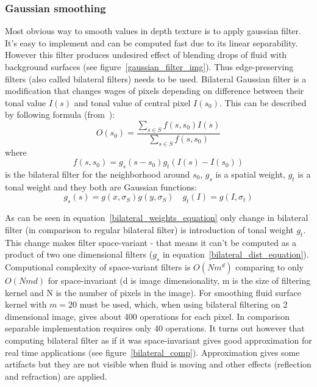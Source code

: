 \subsubsection{Gaussian smoothing} \label{sec:gaussiansmoothing}
Most obvious way to smooth values in depth texture is to apply gaussian filter. It's easy to implement and can be computed fast due to its linear separability. However this filter produces undesired effect of blending drops of fluid with background surfaces (see figure~\ref{gaussian_filter_img}). 
Thus edge-preserving filters (also called bilateral filters) needs to be used. Bilateral Gaussian filter is a modification that changes wages of pixels depending on difference between their tonal value $I(s)$ and tonal value of central pixel $I(s_0)$. This can be described by following formula (from~\cite{PhamVliet2005}): 
\begin{equation}
\label{bilateral_equation}
O(s_0) = \frac{\sum_{s \in S}f(s, s_0)I(s)}{\sum_{s \in S}f(s, s_0)}
\end{equation}
where 
\begin{equation}
\label{bilateral_weights_equation}
f(s, s_0) = g_s(s-s_0)g_t(I(s)-I(s_0))
\end{equation}
is the bilateral filter for the neighborhood around $s_0$, $g_s$ is a spatial weight, $g_t$ is a tonal weight and they both are Gaussian functions:
\begin{equation}
\label{bilateral_dist_equation}
g_s(s) = g(x, \sigma_S)g(y, \sigma_S)  \quad   g_t(I) = g(I, \sigma_t)
\end{equation}

As can be seen in equation~\ref{bilateral_weights_equation} only change in bilateral filter (in comparison to regular bilateral filter) is introduction of tonal weight $g_t$. This change makes filter space-variant - that means it can't be computed as a product of two one dimensional filters ($g_s$ in equation~\ref{bilateral_dist_equation}). 
Computional complexity of space-variant filters is $O(Nm^d)$ comparing to only $O(Nmd)$ for space-invariant (d is image dimensionality, m is the size of filtering kernel and N is the number of pixels in the image). For smoothing fluid surface kernel with $m = 20$ must be used, which, when using bilateral filtering on 2 dimensional image, gives about 400 operations for each pixel. In comparison separable implementation requires only 40 operations. It turns out however that computing bilateral filter as if it was space-invariant gives good approximation for real time applications (see figure~\ref{bilateral_comp}). Approximation gives some artifacts but they are not visible when fluid is moving and other effects (reflection and refraction) are applied.

